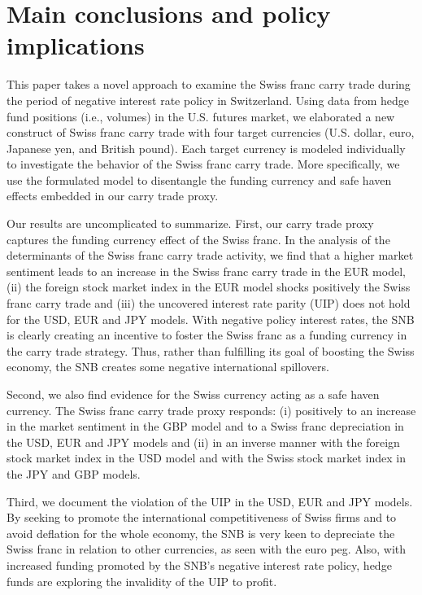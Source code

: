 \documentclass[a4paper, twoside]{templates/ociamthesis}
\begin{document}
\hypertarget{fourfour}{%
\section{Main conclusions and policy implications}\label{fourfour}}

This paper takes a novel approach to examine the Swiss franc carry trade during the period of negative interest rate policy in Switzerland. Using data from hedge fund positions (i.e., volumes) in the U.S. futures market, we elaborated a new construct of Swiss franc carry trade with four target currencies (U.S. dollar, euro, Japanese yen, and British pound). Each target currency is modeled individually to investigate the behavior of the Swiss franc carry trade. More specifically, we use the formulated model to disentangle the funding currency and safe haven effects embedded in our carry trade proxy.

Our results are uncomplicated to summarize. First, our carry trade proxy captures the funding currency effect of the Swiss franc. In the analysis of the determinants of the Swiss franc carry trade activity, we find that a higher market sentiment leads to an increase in the Swiss franc carry trade in the EUR model, (ii) the foreign stock market index in the EUR model shocks positively the Swiss franc carry trade and (iii) the uncovered interest rate parity (UIP) does not hold for the USD, EUR and JPY models. With negative policy interest rates, the SNB is clearly creating an incentive to foster the Swiss franc as a funding currency in the carry trade strategy. Thus, rather than fulfilling its goal of boosting the Swiss economy, the SNB creates some negative international spillovers.

Second, we also find evidence for the Swiss currency acting as a safe haven currency. The Swiss franc carry trade proxy responds: (i) positively to an increase in the market sentiment in the GBP model and to a Swiss franc depreciation in the USD, EUR and JPY models and (ii) in an inverse manner with the foreign stock market index in the USD model and with the Swiss stock market index in the JPY and GBP models.

Third, we document the violation of the UIP in the USD, EUR and JPY models. By seeking to promote the international competitiveness of Swiss firms and to avoid deflation for the whole economy, the SNB is very keen to depreciate the Swiss franc in relation to other currencies, as seen with the euro peg. Also, with increased funding promoted by the SNB's negative interest rate policy, hedge funds are exploring the invalidity of the UIP to profit.
\end{document}
